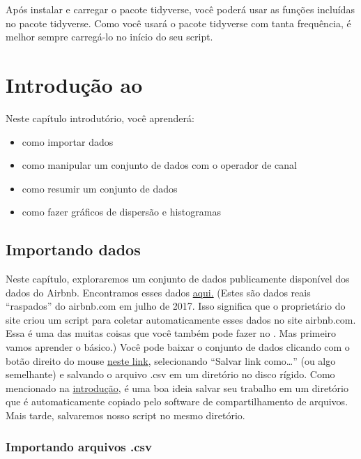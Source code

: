 \documentclass{article}
\begin{document}
Após instalar e carregar o pacote tidyverse, você poderá usar as funções incluídas no pacote tidyverse. Como você usará o pacote tidyverse com tanta frequência, é melhor sempre carregá-lo no início do seu script.

\section{Introdução ao \faRProject}

Neste capítulo introdutório, você aprenderá:

\begin{itemize}
    \item como importar dados
    \item como manipular um conjunto de dados com o operador de canal
    \item como resumir um conjunto de dados
    \item como fazer gráficos de dispersão e histogramas
\end{itemize}

\subsection{Importando dados}

Neste capítulo, exploraremos um conjunto de dados publicamente disponível dos dados do Airbnb. Encontramos esses dados \href{http://tomslee.net/airbnb-data-collection-get-the-data}{aqui.} (Estes são dados reais “raspados” do airbnb.com em julho de 2017. Isso significa que o proprietário do site criou um script para coletar automaticamente esses dados no site airbnb.com. Essa é uma das muitas coisas que você também pode fazer no \faRProject. Mas primeiro vamos aprender o básico.) Você pode baixar o conjunto de dados clicando com o botão direito do mouse \href{http://users.telenet.be/samuelfranssens/tutorial_data/tomslee_airbnb_belgium_1454_2017-07-14.csv}{neste link}, selecionando “Salvar link como…” (ou algo semelhante) e salvando o arquivo .csv em um diretório no disco rígido. Como mencionado na \href{https://bookdown.org/content/1340/getting-familiar-with-rstudio.html#console_script}{introdução}, é uma boa ideia salvar seu trabalho em um diretório que é automaticamente copiado pelo software de compartilhamento de arquivos. Mais tarde, salvaremos nosso script no mesmo diretório.


\subsubsection{Importando arquivos .csv}
\end{document}
